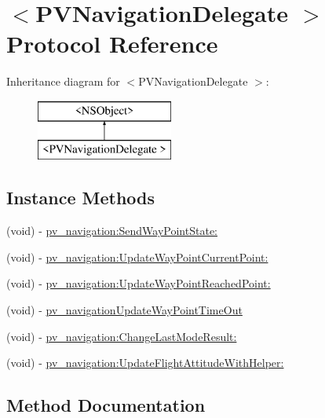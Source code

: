 \hypertarget{protocol_p_v_navigation_delegate_01-p}{}\section{$<$P\+V\+Navigation\+Delegate $>$ Protocol Reference}
\label{protocol_p_v_navigation_delegate_01-p}
Inheritance diagram for $<$P\+V\+Navigation\+Delegate $>$\+:\begin{figure}[H]
\begin{center}
\leavevmode
\includegraphics[height=2.000000cm]{protocol_p_v_navigation_delegate_01-p}
\end{center}
\end{figure}
\subsection*{Instance Methods}
\begin{DoxyCompactItemize}
\item 
(void) -\/ \hyperlink{protocol_p_v_navigation_delegate_01-p_a10e0f7b763f0f32e039a26f80bce4e40}{pv\+\_\+navigation\+:\+Send\+Way\+Point\+State\+:}
\item 
(void) -\/ \hyperlink{protocol_p_v_navigation_delegate_01-p_abe74bece410ee525d1fe5e72bcdd7510}{pv\+\_\+navigation\+:\+Update\+Way\+Point\+Current\+Point\+:}
\item 
(void) -\/ \hyperlink{protocol_p_v_navigation_delegate_01-p_a683e523acf5f6b15c8915e7b84be7429}{pv\+\_\+navigation\+:\+Update\+Way\+Point\+Reached\+Point\+:}
\item 
(void) -\/ \hyperlink{protocol_p_v_navigation_delegate_01-p_af1bd3b2e116b675579e725590ba3f5bf}{pv\+\_\+navigation\+Update\+Way\+Point\+Time\+Out}
\item 
(void) -\/ \hyperlink{protocol_p_v_navigation_delegate_01-p_a973186504332c1704f0d37dacca1aec4}{pv\+\_\+navigation\+:\+Change\+Last\+Mode\+Result\+:}
\item 
(void) -\/ \hyperlink{protocol_p_v_navigation_delegate_01-p_a323096e5f1065a025d40fb87f1685490}{pv\+\_\+navigation\+:\+Update\+Flight\+Attitude\+With\+Helper\+:}
\end{DoxyCompactItemize}


\subsection{Method Documentation}
\mbox{\label{protocol_p_v_navigation_delegate_01-p_a973186504332c1704f0d37dacca1aec4}} 
